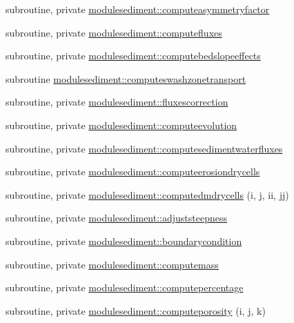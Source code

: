 \begin{DoxyCompactItemize}
\item 
subroutine, private \mbox{\hyperlink{namespacemodulesediment_a7f0383935c0a22b77c959d32f6fa82e5}{modulesediment\+::computeasymmetryfactor}}
\item 
subroutine, private \mbox{\hyperlink{namespacemodulesediment_a1e2e55857d3719dbc4a034eb10281e6c}{modulesediment\+::computefluxes}}
\item 
subroutine, private \mbox{\hyperlink{namespacemodulesediment_ab31a25d99dffd49784478e26814bbea5}{modulesediment\+::computebedslopeeffects}}
\item 
subroutine \mbox{\hyperlink{namespacemodulesediment_a0fc734d1e2e7bacc8606e169d198ead5}{modulesediment\+::computeswashzonetransport}}
\item 
subroutine, private \mbox{\hyperlink{namespacemodulesediment_a982ebf7fcffb2f4bd698f8ec31fea0d1}{modulesediment\+::fluxescorrection}}
\item 
subroutine, private \mbox{\hyperlink{namespacemodulesediment_aba93d4f48399841f747d4c862880f365}{modulesediment\+::computeevolution}}
\item 
subroutine, private \mbox{\hyperlink{namespacemodulesediment_aef98ab4e43c91c6528368e12b3bc5199}{modulesediment\+::computesedimentwaterfluxes}}
\item 
subroutine, private \mbox{\hyperlink{namespacemodulesediment_a8f039d145535e96ceb83a4518f8f82a6}{modulesediment\+::computeerosiondrycells}}
\item 
subroutine, private \mbox{\hyperlink{namespacemodulesediment_a299a31086ad8f844252db856c26e1ce7}{modulesediment\+::computedmdrycells}} (i, j, ii, jj)
\item 
subroutine, private \mbox{\hyperlink{namespacemodulesediment_aa82529eb8b689ee3ddf738441376e275}{modulesediment\+::adjuststeepness}}
\item 
subroutine, private \mbox{\hyperlink{namespacemodulesediment_a3b2c4d5436d7504be300368e5a584c64}{modulesediment\+::boundarycondition}}
\item 
subroutine, private \mbox{\hyperlink{namespacemodulesediment_a38f45fc06e83e0a40fda99cfc71c39ce}{modulesediment\+::computemass}}
\item 
subroutine, private \mbox{\hyperlink{namespacemodulesediment_a967461a16889fe7be50495dad90a178a}{modulesediment\+::computepercentage}}
\item 
subroutine, private \mbox{\hyperlink{namespacemodulesediment_a12a98e7d5cf87fedaf983b4eb24c1633}{modulesediment\+::computeporosity}} (i, j, k)
\item 

\end{DoxyCompactItemize}
